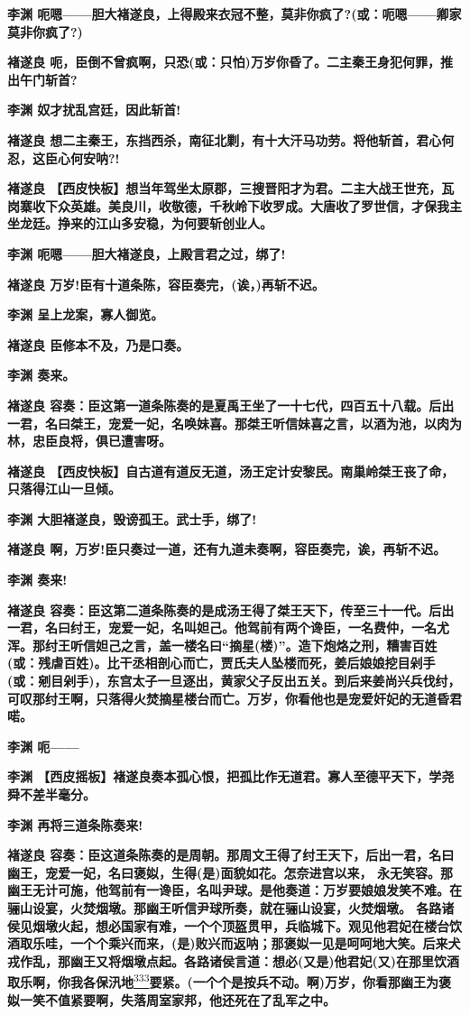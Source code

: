 \textbf{李渊
呃嗯------胆大褚遂良，上得殿来衣冠不整，莫非你疯了?(或：呃嗯------卿家莫非你疯了?)}

\textbf{褚遂良
呃，臣倒不曾疯啊，只恐(或：只怕)万岁你昏了。二主秦王身犯何罪，推出午门斩首?}

\textbf{李渊 奴才扰乱宫廷，因此斩首!}

\textbf{褚遂良
想二主秦王，东挡西杀，南征北剿，有十大汗马功劳。将他斩首，君心何忍，这臣心何安呐?!}

\textbf{褚遂良
【西皮快板】想当年驾坐太原郡，三搜晋阳才为君。二主大战王世充，瓦岗寨收下众英雄。美良川，收敬德，千秋岭下收罗成。大唐收了罗世信，才保我主坐龙廷。挣来的江山多安稳，为何要斩创业人。}

\textbf{李渊 呃嗯------胆大褚遂良，上殿言君之过，绑了!}

\textbf{褚遂良 万岁!臣有十道条陈，容臣奏完，(诶，)再斩不迟。}

\textbf{李渊 呈上龙案，寡人御览。}

\textbf{褚遂良 臣修本不及，乃是口奏。}

\textbf{李渊 奏来。}

\textbf{褚遂良
容奏：臣这第一道条陈奏的是夏禹王坐了一十七代，四百五十八载。后出一君，名曰桀王，宠爱一妃，名唤妹喜。那桀王听信妹喜之言，以酒为池，以肉为林，忠臣良将，俱已遭害呀。}

\textbf{褚遂良
【西皮快板】自古道有道反无道，汤王定计安黎民。南巢岭桀王丧了命，只落得江山一旦倾。}

\textbf{李渊 大胆褚遂良，毁谤孤王。武士手，绑了!}

\textbf{褚遂良
啊，万岁!臣只奏过一道，还有九道未奏啊，容臣奏完，诶，再斩不迟。}

\textbf{李渊 奏来!}

\textbf{褚遂良
容奏：臣这第二道条陈奏的是成汤王得了桀王天下，传至三十一代。后出一君，名曰纣王，宠爱一妃，名叫妲己。他驾前有两个谗臣，一名费仲，一名尤浑。那纣王听信妲己之言，盖一楼名曰``摘星(楼)''。造下炮烙之刑，糟害百姓(或：残虐百姓)。比干丞相剖心而亡，贾氏夫人坠楼而死，姜后娘娘挖目剁手(或：剜目剁手)，东宫太子一旦逐出，黄家父子反出五关。到后来姜尚兴兵伐纣，可叹那纣王啊，只落得火焚摘星楼台而亡。万岁，你看他也是宠爱奸妃的无道昏君喏。}

\textbf{李渊 呃------}

\textbf{李渊
【西皮摇板】褚遂良奏本孤心恨，把孤比作无道君。寡人至德平天下，学尧舜不差半毫分。}

\textbf{李渊 再将三道条陈奏来!}

\textbf{褚遂良
容奏：臣这道条陈奏的是周朝。那周文王得了纣王天下，后出一君，名曰幽王，宠爱一妃，名曰褒姒，生得(是)面貌如花。怎奈进宫以来，
永无笑容。那幽王无计可施，他驾前有一谗臣，名叫尹球。是他奏道：万岁要娘娘发笑不难。在骊山设宴，火焚烟墩。那幽王听信尹球所奏，就在骊山设宴，火焚烟墩。
各路诸侯见烟墩火起，想必国家有难，一个个顶盔贯甲，兵临城下。观见他君妃在楼台饮酒取乐哇，一个个乘兴而来，(是)败兴而返呐；那褒姒一见是呵呵地大笑。后来犬戎作乱，那幽王又将烟墩点起。各路诸侯言道：想必(又是)他君妃(又)在那里饮酒取乐啊，你我各保汛地}\protect\hyperlink{fn333}{\textsuperscript{333}}\textbf{要紧。(一个个是按兵不动。啊)万岁，你看那幽王为褒姒一笑不值紧要啊，失落周室家邦，他还死在了乱军之中。}

